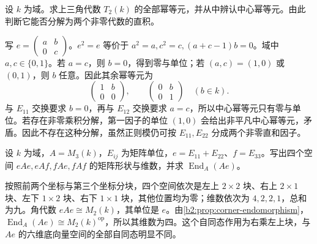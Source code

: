 \begin{exercise}\label{b2:ex:11-triangular-idempotents}
	设 \(k\) 为域。求上三角代数 \(T_2(k)\) 的全部幂等元，并从中辨认中心幂等元。由此判断它能否分解为两个非零代数的直积。
\end{exercise}
\begin{solution}
	写 \(e=\begin{pmatrix}a&b\\0&c\end{pmatrix}\)。\(e^2=e\) 等价于 \(a^2=a,c^2=c,(a+c-1)b=0\)。域中 \(a,c\in\{0,1\}\)。若 \(a=c\)，则 \(b=0\)，得到零与单位；若 \((a,c)=(1,0)\) 或 \((0,1)\)，则 \(b\) 任意。因此其余幂等元为
	\[
		\begin{pmatrix}1&b\\0&0\end{pmatrix},\qquad
		\begin{pmatrix}0&b\\0&1\end{pmatrix}\quad(b\in k).
	\]
	与 \(E_{11}\) 交换要求 \(b=0\)，再与 \(E_{12}\) 交换要求 \(a=c\)，所以中心幂等元只有零与单位。若存在非零乘积分解，第一因子的单位 \((1,0)\) 会给出非平凡中心幂等元，矛盾。因此不存在这种分解，虽然正则模仍可按 \(E_{11},E_{22}\) 分成两个非零直和因子。
\end{solution}

\begin{exercise}\label{b2:ex:11-large-corner}
	设 \(k\) 为域，\(A=M_3(k)\)，\(E_{ij}\) 为矩阵单位，\(e=E_{11}+E_{22}\)、\(f=E_{33}\)。写出四个空间 \(eAe,eAf,fAe,fAf\) 的矩阵形状与维数，并求 \(\operatorname{End}_A(Ae)\)。
\end{exercise}
\begin{solution}
	按照前两个坐标与第三个坐标分块，四个空间依次是左上 \(2\times2\) 块、右上 \(2\times1\) 块、左下 \(1\times2\) 块、右下 \(1\times1\) 块，其他位置均为零；维数依次为 \(4,2,2,1\)，总和为九。角代数 \(eAe\cong M_2(k)\)，其单位是 \(e\)。由\cref{b2:prop:corner-endomorphism}， \(\operatorname{End}_A(Ae)\cong M_2(k)^{\mathrm{op}}\)，所以其维数为四。这个自同态作用为右乘左上块，与 \(Ae\) 的六维底向量空间的全部自同态明显不同。
\end{solution}

